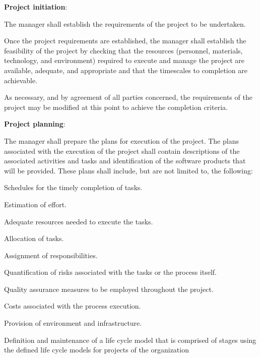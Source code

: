 			\begin{adjustwidth}{2em}{0pt}

				\begin{compactenum}

					\item {\bf Project initiation}:
					\begin{compactenum}
						\item The manager shall establish the requirements of the project to be undertaken.

						\item Once the project requirements are established, the manager shall establish the feasibility of the project by checking that the resources (personnel, materials, technology, and environment) required to execute and manage the project are available, adequate, and appropriate and that the timescales to completion are achievable.

						\item As necessary, and by agreement of all parties concerned, the requirements of the project may be modified at this point to achieve the completion criteria.
					\end{compactenum}

					\item {\bf Project planning}:
					\begin{compactenum}
						\item The manager shall prepare the plans for execution of the project. The plans associated with the execution of the project shall contain descriptions of the associated activities and tasks and identification of the software products that will be provided. These plans shall include, but are not limited to, the following:

						\begin{compactenum}
							\item Schedules for the timely completion of tasks.
							\item Estimation of effort.
							\item Adequate resources needed to execute the tasks.
							\item Allocation of tasks.
							\item Assignment of responsibilities.
							\item Quantification of risks associated with the tasks or the process itself.
							\item Quality assurance measures to be employed throughout the project.
							\item Costs associated with the process execution.
							\item Provision of environment and infrastructure.
							\item Definition and maintenance of a life cycle model that is comprised of stages using the defined life cycle models for projects of the organization
						\end{compactenum}


\end{compactenum}
\end{compactenum}
\end{adjustwidth}
